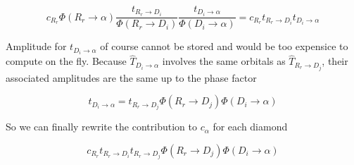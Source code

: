 \documentclass[./thesis.tex]{subfiles}
\begin{document}
\begin{equation}
c_{R _r} \Phi(R _r \rightarrow \alpha) \frac{t_{R _r \rightarrow D_i}}{\Phi(R _r \rightarrow D_i)} \frac{t_{D_i \rightarrow \alpha}}{\Phi(D_i \rightarrow \alpha)} =c_{R _r} t_{R_r \rightarrow D_i} t_{D_i \rightarrow \alpha}
\end{equation}

Amplitude for $t_{D_i \rightarrow \alpha}$ of course cannot be stored and would be too expensice to compute on the fly. Because $\hat T_{D_i \rightarrow \alpha}$ involves the same orbitals as $\hat T_{R _r \rightarrow D_j}$, their associated amplitudes are the same up to the phase factor

\begin{equation}
t_{D_i \rightarrow \alpha} = t_{R _r \rightarrow D_j} \Phi(R _r \rightarrow D_j)\Phi(D_i \rightarrow \alpha)
\end{equation}

So we can finally rewrite the contribution to $c_\alpha$ for each diamond

\begin{equation}
c_{R _r} t_{R _r \rightarrow D_i} t_{R _r \rightarrow D_j} \Phi(R _r \rightarrow D_j)\Phi(D_i \rightarrow \alpha)
\end{equation}
\end{document}
